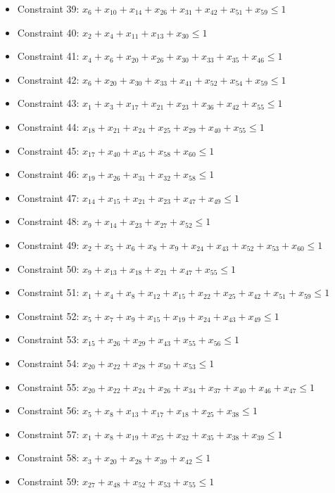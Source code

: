 \documentclass[11pt]{article}
\begin{document}
\begin{itemize}
\item Constraint 39: $x_{6} + x_{10} + x_{14} + x_{26} + x_{31} + x_{42} + x_{51} + x_{59} \le 1$
\item Constraint 40: $x_{2} + x_{4} + x_{11} + x_{13} + x_{30} \le 1$
\item Constraint 41: $x_{4} + x_{6} + x_{20} + x_{26} + x_{30} + x_{33} + x_{35} + x_{46} \le 1$
\item Constraint 42: $x_{6} + x_{20} + x_{30} + x_{33} + x_{41} + x_{52} + x_{54} + x_{59} \le 1$
\item Constraint 43: $x_{1} + x_{3} + x_{17} + x_{21} + x_{23} + x_{36} + x_{42} + x_{55} \le 1$
\item Constraint 44: $x_{18} + x_{21} + x_{24} + x_{25} + x_{29} + x_{40} + x_{55} \le 1$
\item Constraint 45: $x_{17} + x_{40} + x_{45} + x_{58} + x_{60} \le 1$
\item Constraint 46: $x_{19} + x_{26} + x_{31} + x_{32} + x_{58} \le 1$
\item Constraint 47: $x_{14} + x_{15} + x_{21} + x_{23} + x_{47} + x_{49} \le 1$
\item Constraint 48: $x_{9} + x_{14} + x_{23} + x_{27} + x_{52} \le 1$
\item Constraint 49: $x_{2} + x_{5} + x_{6} + x_{8} + x_{9} + x_{24} + x_{43} + x_{52} + x_{53} + x_{60} \le 1$
\item Constraint 50: $x_{9} + x_{13} + x_{18} + x_{21} + x_{47} + x_{55} \le 1$
\item Constraint 51: $x_{1} + x_{4} + x_{8} + x_{12} + x_{15} + x_{22} + x_{25} + x_{42} + x_{51} + x_{59} \le 1$
\item Constraint 52: $x_{5} + x_{7} + x_{9} + x_{15} + x_{19} + x_{24} + x_{43} + x_{49} \le 1$
\item Constraint 53: $x_{15} + x_{26} + x_{29} + x_{43} + x_{55} + x_{56} \le 1$
\item Constraint 54: $x_{20} + x_{22} + x_{28} + x_{50} + x_{53} \le 1$
\item Constraint 55: $x_{20} + x_{22} + x_{24} + x_{26} + x_{34} + x_{37} + x_{40} + x_{46} + x_{47} \le 1$
\item Constraint 56: $x_{5} + x_{8} + x_{13} + x_{17} + x_{18} + x_{25} + x_{38} \le 1$
\item Constraint 57: $x_{1} + x_{8} + x_{19} + x_{25} + x_{32} + x_{35} + x_{38} + x_{39} \le 1$
\item Constraint 58: $x_{3} + x_{20} + x_{28} + x_{39} + x_{42} \le 1$
\item Constraint 59: $x_{27} + x_{48} + x_{52} + x_{53} + x_{55} \le 1$

\end{itemize}
\end{document}
